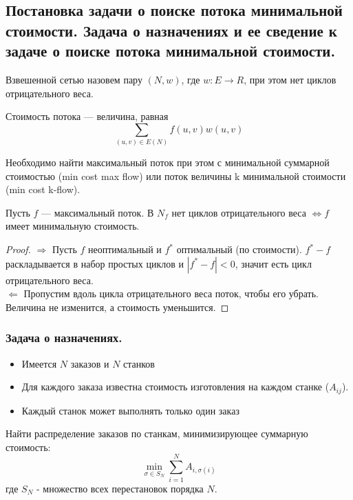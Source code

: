 \documentclass[a4paper,14pt]{article}
\begin{document}
    \subsection{Постановка задачи о поиске потока минимальной стоимости. Задача о назначениях и ее сведение к задаче о поиске потока минимальной стоимости.}
    \begin{Def}
        Взвешенной сетью назовем пару $(N ,w)$, где $w : E\rightarrow R$, при этом
нет циклов отрицательного веса.
    \end{Def}
    \begin{Def}
        Стоимость потока — величина, равная
        \[\sum\limits_{(u, v)\in E(N)} f(u, v)w(u,v)\]
    \end{Def}
    \begin{problem}
        Необходимо найти максимальный поток при этом с минимальной
суммарной стоимостью (min cost max flow) или поток величины k
минимальной стоимости (min cost k-flow).
    \end{problem}
    \begin{prop}
        Пусть $f$ — максимальный поток. В $N_f$ нет циклов отрицательного
веса $\iff f$ имеет минимальную стоимость.
    \end{prop}
    \begin{proof}
        $\Rightarrow$ Пусть $f$ неоптимальный и $f^*$ оптимальный (по стоимости). $f^*-f$ раскладывается в набор простых циклов и $|f^*-f|<0$, значит есть цикл отрицательного веса. \\
        $\Leftarrow$ Пропустим вдоль цикла отрицательного веса поток, чтобы его убрать. Величина не изменится, а стоимость уменьшится.
    \end{proof}
    \subsubsection*{Задача о назначениях.}
    \begin{problem}
        \begin{itemize}
            \item Имеется $N$ заказов и $N$ станков
            \item Для каждого заказа известна стоимость изготовления на
            каждом станке ($A_{ij}$).
            \item Каждый станок может выполнять только один заказ
        \end{itemize}
        Найти распределение заказов по станкам, минимизирующее
суммарную стоимость:
        \[\min_{\sigma \in S_N} \sum_{i=1}^N A_{i, \sigma(i)}\]
        где $S_N$ - множество всех перестановок порядка $N$.
    \end{problem}
\end{document}
